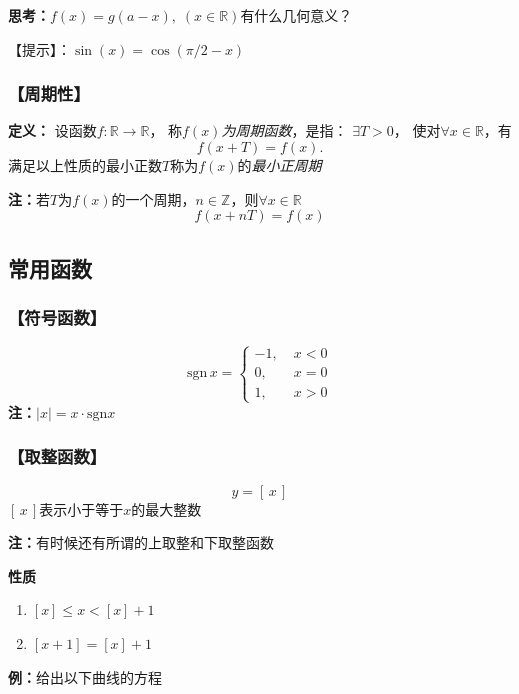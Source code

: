 {{\bf 思考：}$f(x)=g(a-x),\;(x\in\mathbb{R})$有什么几何意义？}

【提示】：$\sin(x)=\cos(\pi/2-x)$

\subsubsection{【周期性】}

{{\bf 定义：}}
设函数$f:\mathbb{R}\to\mathbb{R}$，
称{\it $f(x)$为周期函数}，是指： $\exists T>0$，
使对$\forall x\in\mathbb{R}$，有
$$f(x+T)=f(x).$$
 满足以上性质的最小正数$T$称为$f(x)$的{\it 最小正周期}
		 
{\bf 注：}若$T$为$f(x)$的一个周期，$n\in\mathbb{Z}$，则$\forall x\in\mathbb{R}$
$$f(x+nT)=f(x)$$

\subsection{常用函数}

\subsubsection{\bf 【符号函数】}

  $$\bm{\mathrm{sgn}}\,x =\left\{
	\begin{array}{rl}
	-1,\;&x<0 \\
	0,\;&x=0 \\
	1,\;&x>0
	\end{array}
  \right.$$
  {\bf 注：}$|x|=x \cdot\mathrm{sgn} x$
	

 \subsubsection{\bf 【取整函数】}

  $$y=\left[ \,x\, \right]$$
  $[\,x\,]$表示小于等于$x$的最大整数

	
{\bf 注：}有时候还有所谓的上取整和下取整函数

{\bf 性质}
\begin{enumerate}[(1)]
  \setlength{\itemindent}{1cm}
  \item $[x]\leq x<[x]+1$
  \item $[x+1]=[x]+1$
\end{enumerate}

{{\bf 例：}给出以下曲线的方程}

